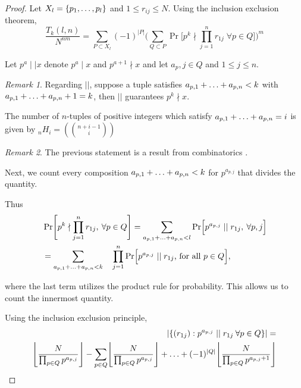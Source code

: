\documentclass[10pt,a4paper]{article}
\theoremstyle{definition}
\theoremstyle{remark}
\newtheorem{remark}{Remark}
\begin{document}
	\begin{proof}
		  Let \(X_l=\{p_1,\mathellipsis,p_l\}\) and \(1\leq r_{ij}\leq N\). Using the inclusion exclusion theorem, 
		  \begin{equation}
		  	\frac{T_k(l,n)}{N^{nm}}=\sum_{P\subset X_l}(-1)^{|P|}\Biggl(\sum_{Q\subset P}\Pr\Biggl[p^k\nmid \prod_{j=1}^{n}r_{1j} \; \forall p\in Q \Biggr]\Biggr)^m
		  \end{equation}
		  
		  Let \(p^a \mid\mid x\) denote \(p^a\mid x\) and \(p^{a+1}\nmid x\) and let \(a_p,j\in Q\) and \(1\leq j \leq n\).
		  
		  \begin{remark}
		  	Regarding \(||\), suppose a tuple satisfies \(a_{p,1}+\mathellipsis+a_{p,n}<k\) with \(a_{p,1}+\mathellipsis+a_{p,n}+1=k\), then \(||\) guarantees \(p^k \nmid x\).
		  \end{remark} 
		  
		  
		  The number of \(n\)-tuples of positive integers which satisfy \(a_{p,1}+\mathellipsis+a_{p,n}=i\) is given by \(_nH_i = (\binom{n+i-1}{i})\)
		  \begin{remark}
		  	The previous statement is a result from combinatorics \cite{noauthor_composition_2022}\cite{noauthor_stars_2022}.
		  \end{remark}
		  
		  Next, we count every composition \(a_{p,1}+\mathellipsis+a_{p,n}<k\) for \(p^{a_{p,j}}\) that divides the quantity.
		  
		  Thus \begin{align}
		  	&\Pr\Biggl[p^k\nmid \prod_{j=1}^{n}r_{1j},\:\forall p\in Q\Biggr] = \sum_{a_{p,1}+\mathellipsis+a_{p,n}<l}\Pr\Bigl[p^{a_{p,j}} \mid\mid r_{1j},\: \forall p,j\Bigr]\\
		  	 &=\sum_{a_{p,1}+\mathellipsis+a_{p,n}<k}\quad\prod_{j=1}^{n}\Pr\Bigl[p^{a_{p,j}} \mid\mid r_{1j} \text{, for all } p\in Q\Bigr],  
		  \end{align}
	  
	  	where the last term utilizes the product rule for probability. This allows us to count the innermost quantity. 
		  
		  Using the inclusion exclusion principle, 
		  \begin{align}
		  	|\{(r_{1j}): p^{a_{{p,j}}}\mid\mid r_{1j} \: \forall p\in Q\}| = \\
		  	\Biggl\lfloor\frac{N}{\prod_{p\in Q}p^{a_{p,j}}}\Biggr\rfloor-\sum_{p\in Q}\Biggl\lfloor \frac{N}{\prod_{p\in Q}p^{a_{p,j}}}\Biggr\rfloor+\mathellipsis+(-1)^{|Q|}\Biggl\lfloor\frac{N}{\prod_{p\in Q}p^{a_{p,j}+1}}\Biggr\rfloor
		  \end{align}
		  

\end{proof}
\end{document}
